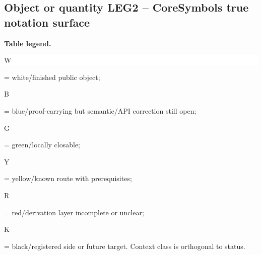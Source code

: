 \subsection*{Object or quantity LEG2 -- CoreSymbols true notation surface}
\hypertarget{objproof:LEG2}{}
\par\smallskip\noindent\begin{minipage}{0.99\linewidth}\footnotesize\raggedright\textbf{Table legend.} \colorbox{white}{\strut W} = white/finished public object; \colorbox{cyan!20}{\strut B} = blue/proof-carrying but semantic/API correction still open; \colorbox{green!18}{\strut G} = green/locally closable; \colorbox{yellow!25}{\strut Y} = yellow/known route with prerequisites; \colorbox{red!20}{\strut R} = red/derivation layer incomplete or unclear; \colorbox{black!18}{\strut K} = black/registered side or future target. Context class is orthogonal to status.\end{minipage}\par\vspace{0.25em}
